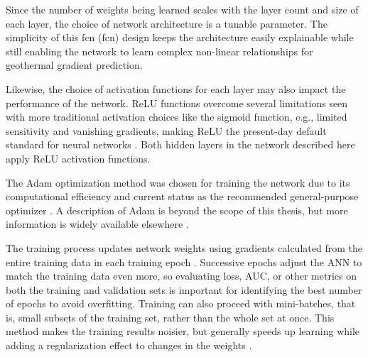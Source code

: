Since the number of weights being learned scales with the layer count and size of each layer, the choice of network architecture is a tunable parameter. The simplicity of this \acrlong{fcn} (\acrshort{fcn}) design keeps the architecture easily explainable while still enabling the network to learn complex non-linear relationships for geothermal gradient prediction.

Likewise, the choice of activation functions for each layer may also impact the performance of the network. ReLU functions overcome several limitations seen with more traditional activation choices like the sigmoid function, e.g., limited sensitivity and vanishing gradients, making ReLU the present-day default standard for neural networks \citep{brownlee_gentle_2019}. Both hidden layers in the network described here apply ReLU activation functions.

The Adam optimization method was chosen for training the network due to its computational efficiency and current status as the recommended general-purpose optimizer \citep{brownlee_gentle_2017}. A description of Adam is beyond the scope of this thesis, but more information is widely available elsewhere \citep[e.g.,\ ][]{kingma_adam_2017}.

The training process updates network weights using gradients calculated from the entire training data in each training epoch \citep[p.\ 397]{hastie_elements_2009}. Successive epochs adjust the ANN to match the training data even more, so evaluating loss, AUC, or other metrics on both the training and validation sets is important for identifying the best number of epochs to avoid overfitting. Training can also proceed with mini-batches, that is, small subsets of the training set, rather than the whole set at once. This method makes the training results noisier, but generally speeds up learning while adding a regularization effect to changes in the weights \citep{brownlee_how_2019}.  

